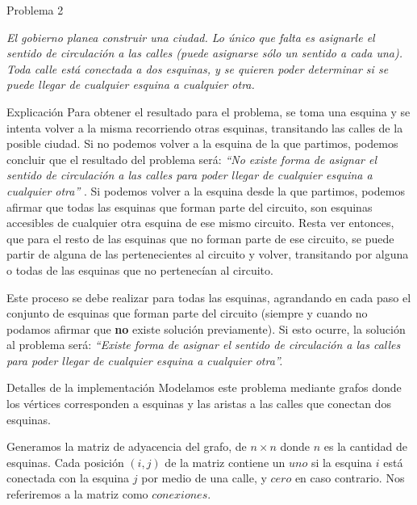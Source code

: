 \begin{section}{Problema 2}

	\textit{El gobierno planea construir una ciudad. Lo único que falta es asignarle el sentido de circulación a las calles (puede asignarse sólo un sentido a cada una). Toda calle está conectada a dos esquinas, y se quieren poder determinar si se puede llegar de cualquier esquina a cualquier otra.}
		
	\begin{subsection}{Explicación}
	Para obtener el resultado para el problema, se toma una esquina y se intenta volver a la misma recorriendo otras esquinas, transitando las calles de la posible ciudad. Si no podemos volver a la esquina de la que partimos, podemos concluir que el resultado del problema será: {\em ``No existe forma de asignar el sentido de circulación a las calles para poder llegar de cualquier esquina a cualquier otra'' }. Si podemos volver a la esquina desde la que partimos, podemos afirmar que todas las esquinas que forman parte del circuito, son esquinas accesibles de cualquier otra esquina de ese mismo circuito. Resta ver entonces, que para el resto de las esquinas que no forman parte de ese circuito, se puede partir de alguna de las pertenecientes al circuito y volver, transitando por alguna o todas de las esquinas que no pertenecían al circuito. 
	
	Este proceso se debe realizar para todas las esquinas, agrandando en cada paso el conjunto de esquinas que forman parte del circuito (siempre y cuando no podamos afirmar que \textbf{no} existe solución previamente). Si esto ocurre, la solución al problema será: {\em ``Existe forma de asignar el sentido de circulación a las calles para poder llegar de cualquier esquina a cualquier otra''. }
		
	\end{subsection}

	\begin{subsection}{Detalles de la implementación}
		Modelamos este problema mediante grafos donde los vértices corresponden a esquinas y las aristas a las calles que conectan dos esquinas.	

		Generamos la matriz de adyacencia del grafo, de $n\times n$ donde $n$ es la cantidad de esquinas. Cada posición $(i,j)$ de la matriz contiene un $uno$ si la esquina $i$ está conectada con la esquina $j$ por medio de una calle, y $cero$ en caso contrario. Nos referiremos a la matriz como $conexiones$.



\end{subsection}
\end{section}
